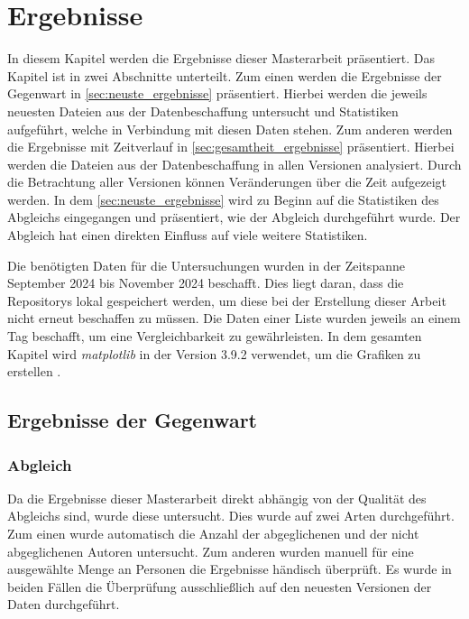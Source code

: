 \chapter{Ergebnisse}
\label{chap:ergebnisse}
In diesem Kapitel werden die Ergebnisse dieser Masterarbeit präsentiert.
Das Kapitel ist in zwei Abschnitte unterteilt.
Zum einen werden die Ergebnisse der Gegenwart in \autoref{sec:neuste_ergebnisse} präsentiert.
Hierbei werden die jeweils neuesten Dateien aus der Datenbeschaffung untersucht und Statistiken aufgeführt, welche in Verbindung mit diesen Daten stehen.
Zum anderen werden die Ergebnisse mit Zeitverlauf in \autoref{sec:gesamtheit_ergebnisse} präsentiert.
Hierbei werden die Dateien aus der Datenbeschaffung in allen Versionen analysiert.
Durch die Betrachtung aller Versionen können Veränderungen über die Zeit aufgezeigt werden.
In dem \autoref{sec:neuste_ergebnisse} wird zu Beginn auf die Statistiken des Abgleichs eingegangen und präsentiert, wie der Abgleich durchgeführt wurde.
Der Abgleich hat einen direkten Einfluss auf viele weitere Statistiken.

Die benötigten Daten für die Untersuchungen wurden in der Zeitspanne September 2024 bis November 2024 beschafft.
Dies liegt daran, dass die Repositorys lokal gespeichert werden, um diese bei der Erstellung dieser Arbeit nicht erneut beschaffen zu müssen.
Die Daten einer Liste wurden jeweils an einem Tag beschafft, um eine Vergleichbarkeit zu gewährleisten.
In dem gesamten Kapitel wird \emph{matplotlib} in der Version 3.9.2 verwendet, um die Grafiken zu erstellen \autocites{hunter_matplotlib_2007}{hunter_matplotlib_2024}.

\section{Ergebnisse der Gegenwart}
\label{sec:neuste_ergebnisse}
\subsection*{Abgleich}
Da die Ergebnisse dieser Masterarbeit direkt abhängig von der Qualität des Abgleichs sind, wurde diese untersucht.
Dies wurde auf zwei Arten durchgeführt.
Zum einen wurde automatisch die Anzahl der abgeglichenen und der nicht abgeglichenen Autoren untersucht.
Zum anderen wurden manuell für eine ausgewählte Menge an Personen die Ergebnisse händisch überprüft.
Es wurde in beiden Fällen die Überprüfung ausschließlich auf den neuesten Versionen der Daten durchgeführt.

